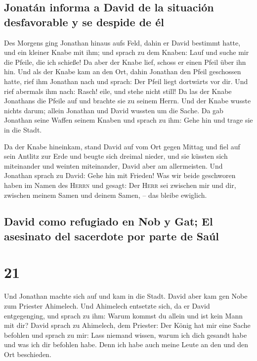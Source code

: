 \hypertarget{jonatuxe1n-informa-a-david-de-la-situaciuxf3n-desfavorable-y-se-despide-de-uxe9l}{%
\subsection{Jonatán informa a David de la situación desfavorable y se
despide de
él}\label{jonatuxe1n-informa-a-david-de-la-situaciuxf3n-desfavorable-y-se-despide-de-uxe9l}}

 Des Morgens ging Jonathan hinaus aufs Feld, dahin er
David bestimmt hatte, und ein kleiner Knabe mit ihm;  und
sprach zu dem Knaben: Lauf und suche mir die Pfeile, die ich schieße! Da
aber der Knabe lief, schoss er einen Pfeil über ihn hin. 
Und als der Knabe kam an den Ort, dahin Jonathan den Pfeil geschossen
hatte, rief ihm Jonathan nach und sprach: Der Pfeil liegt dortwärts vor
dir.  Und rief abermals ihm nach: Rasch! eile, und stehe
nicht still! Da las der Knabe Jonathans die Pfeile auf und brachte sie
zu seinem Herrn.  Und der Knabe wusste nichts darum;
allein Jonathan und David wussten um die Sache.  Da gab
Jonathan seine Waffen seinem Knaben und sprach zu ihm: Gehe hin und
trage sie in die Stadt.

 Da der Knabe hineinkam, stand David auf vom Ort gegen
Mittag und fiel auf sein Antlitz zur Erde und beugte sich dreimal
nieder, und sie küssten sich miteinander und weinten miteinander, David
aber am allermeisten.  Und Jonathan sprach zu David: Gehe
hin mit Frieden! Was wir beide geschworen haben im Namen des
\textsc{Herrn} und gesagt: Der \textsc{Herr} sei zwischen mir und dir,
zwischen meinem Samen und deinem Samen, -- das bleibe ewiglich.

\hypertarget{david-como-refugiado-en-nob-y-gat-el-asesinato-del-sacerdote-por-parte-de-sauxfal}{%
\subsection{David como refugiado en Nob y Gat; El asesinato del
sacerdote por parte de
Saúl}\label{david-como-refugiado-en-nob-y-gat-el-asesinato-del-sacerdote-por-parte-de-sauxfal}}

\hypertarget{section-20}{%
\section{21}\label{section-20}}

 Und Jonathan machte sich auf und kam in die Stadt.
 David aber kam gen Nobe zum Priester Ahimelech. Und
Ahimelech entsetzte sich, da er David entgegenging, und sprach zu ihm:
Warum kommst du allein und ist kein Mann mit dir?  David
sprach zu Ahimelech, dem Priester: Der König hat mir eine Sache befohlen
und sprach zu mir: Lass niemand wissen, warum ich dich gesandt habe und
was ich dir befohlen habe. Denn ich habe auch meine Leute an den und den
Ort beschieden.

